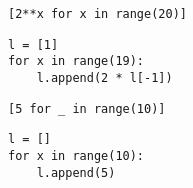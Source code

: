 \documentclass[12pt,a4paper]{article}
\begin{document}
\begin{multicols}{2}

\begin{lstlisting}
[2**x for x in range(20)]
\end{lstlisting}

\begin{lstlisting}
l = [1]
for x in range(19):
    l.append(2 * l[-1])
\end{lstlisting}


\begin{lstlisting}
[5 for _ in range(10)]
\end{lstlisting}

\begin{lstlisting}
l = []
for x in range(10):
    l.append(5)
\end{lstlisting}


\end{multicols}
\end{document}

